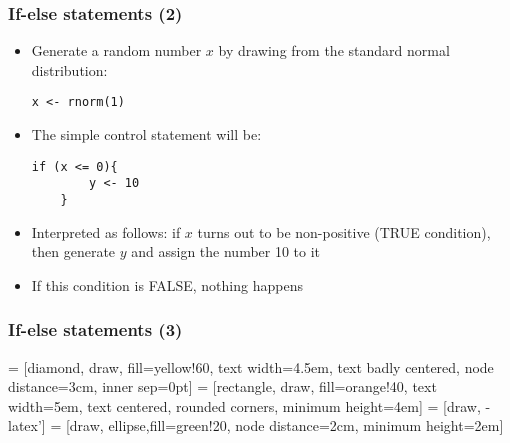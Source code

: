 \documentclass[10pt]{beamer}
\theoremstyle{definition}
\begin{document}
\begin{frame}[fragile]
\frametitle{If-else statements (2)}
\begin{itemize}
	\item Generate a random number $x$ by drawing from the standard normal distribution:
	\begin{lstlisting}[style = rstyle, breaklines]
	x <- rnorm(1)
	\end{lstlisting}
	\item The simple control statement will be:
	\begin{lstlisting}[style = rstyle, breaklines]
	if (x <= 0){
		y <- 10
	}
	\end{lstlisting}
	\item Interpreted as follows: if $x$ turns out to be non-positive (TRUE condition), then generate $y$ and assign the number 10 to it
	\item If this condition is FALSE, nothing happens
\end{itemize}
\end{frame}

\begin{frame}[fragile]
\frametitle{If-else statements (3)}
 = [diamond, draw, fill=yellow!60, 
    text width=4.5em, text badly centered, node distance=3cm, inner sep=0pt]
 = [rectangle, draw, fill=orange!40, 
    text width=5em, text centered, rounded corners, minimum height=4em]
 = [draw, -latex']
 = [draw, ellipse,fill=green!20, node distance=2cm,
    minimum height=2em]

\begin{center}
\end{center} 
\end{frame}
\end{document}
